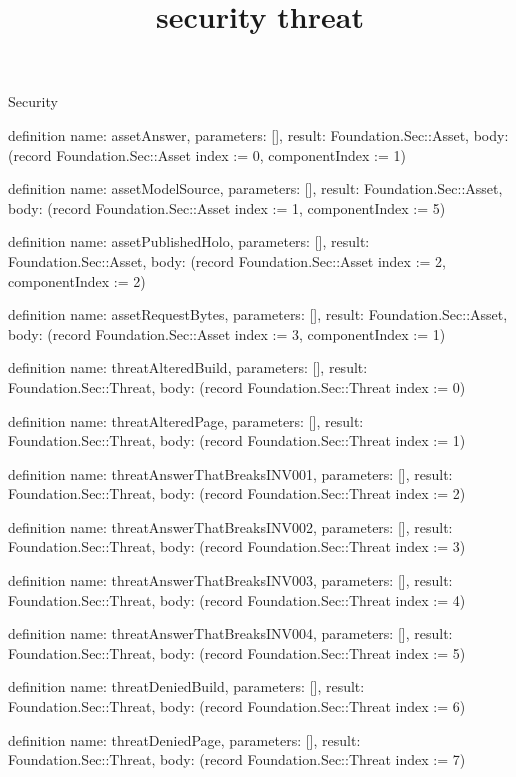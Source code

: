 \begin{lexlean}{Security}
\title{security threat}
\begin{semanticmodule}
definition{
  name: assetAnswer,
  parameters: [],
  result: Foundation.Sec::Asset,
  body: (record Foundation.Sec::Asset {index := 0, componentIndex := 1})
}

definition{
  name: assetModelSource,
  parameters: [],
  result: Foundation.Sec::Asset,
  body: (record Foundation.Sec::Asset {index := 1, componentIndex := 5})
}

definition{
  name: assetPublishedHolo,
  parameters: [],
  result: Foundation.Sec::Asset,
  body: (record Foundation.Sec::Asset {index := 2, componentIndex := 2})
}

definition{
  name: assetRequestBytes,
  parameters: [],
  result: Foundation.Sec::Asset,
  body: (record Foundation.Sec::Asset {index := 3, componentIndex := 1})
}

definition{
  name: threatAlteredBuild,
  parameters: [],
  result: Foundation.Sec::Threat,
  body: (record Foundation.Sec::Threat {index := 0})
}

definition{
  name: threatAlteredPage,
  parameters: [],
  result: Foundation.Sec::Threat,
  body: (record Foundation.Sec::Threat {index := 1})
}

definition{
  name: threatAnswerThatBreaksINV001,
  parameters: [],
  result: Foundation.Sec::Threat,
  body: (record Foundation.Sec::Threat {index := 2})
}

definition{
  name: threatAnswerThatBreaksINV002,
  parameters: [],
  result: Foundation.Sec::Threat,
  body: (record Foundation.Sec::Threat {index := 3})
}

definition{
  name: threatAnswerThatBreaksINV003,
  parameters: [],
  result: Foundation.Sec::Threat,
  body: (record Foundation.Sec::Threat {index := 4})
}

definition{
  name: threatAnswerThatBreaksINV004,
  parameters: [],
  result: Foundation.Sec::Threat,
  body: (record Foundation.Sec::Threat {index := 5})
}

definition{
  name: threatDeniedBuild,
  parameters: [],
  result: Foundation.Sec::Threat,
  body: (record Foundation.Sec::Threat {index := 6})
}

definition{
  name: threatDeniedPage,
  parameters: [],
  result: Foundation.Sec::Threat,
  body: (record Foundation.Sec::Threat {index := 7})
}


\end{semanticmodule}
\end{lexlean}
